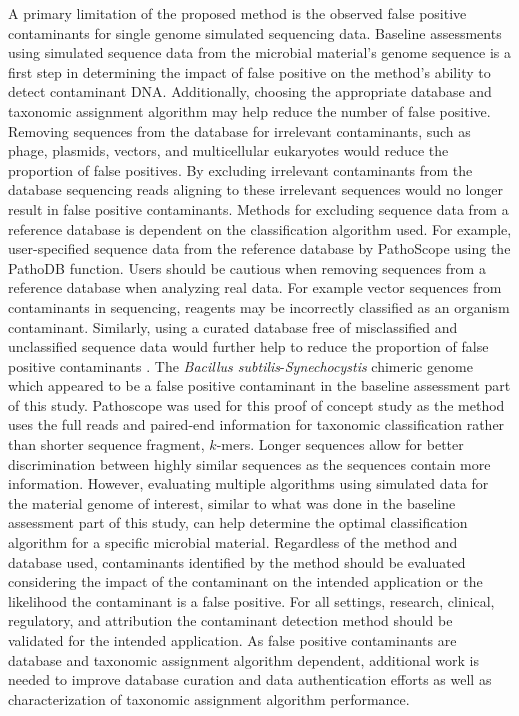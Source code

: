 \documentclass[fleqn,10pt,lineno]{wlpeerj}\usepackage[]{graphicx}\usepackage[]{color}
\begin{document}
A primary limitation of the proposed method is the observed false positive contaminants for single genome simulated sequencing data. 
Baseline assessments using simulated sequence data from the microbial material's genome sequence is a first step in determining the impact of false positive on the method's ability to detect contaminant DNA. 
Additionally, choosing the appropriate database and taxonomic assignment algorithm may help reduce the number of false positive.
Removing sequences from the database for irrelevant contaminants, such as phage, plasmids, vectors, and multicellular eukaryotes would reduce the proportion of false positives. 
By excluding irrelevant contaminants from the database sequencing reads aligning to these irrelevant sequences would no longer result in false positive contaminants. 
Methods for excluding sequence data from a reference database is dependent on the classification algorithm used. 
For example, user-specified sequence data from the reference database by PathoScope using the PathoDB function. 
Users should be cautious when removing sequences from a reference database when analyzing real data. 
For example vector sequences from contaminants in sequencing, reagents may be incorrectly classified as an organism contaminant. 
Similarly, using a curated database free of misclassified and unclassified sequence data would further help to reduce the proportion of false positive contaminants \citep{tennessen2015prodege}. 
The \textit{Bacillus subtilis}-\textit{Synechocystis} chimeric genome which appeared to be a false positive contaminant in the baseline assessment part of this study. 
Pathoscope was used for this proof of concept study as the method uses the full reads and paired-end information for taxonomic classification rather than shorter sequence fragment, $k$-mers. 
Longer sequences allow for better discrimination between highly similar sequences as the sequences contain more information. 
However, evaluating multiple algorithms using simulated data for the material genome of interest, 
similar to what was done in the baseline assessment part of this study, 
can help determine the optimal classification algorithm for a specific microbial material. 
Regardless of the method and database used, contaminants identified by the method should be evaluated considering the impact of the contaminant on the intended application or the likelihood the contaminant is a false positive. 
For all settings, research, clinical, regulatory, and attribution the contaminant detection method should be validated for the intended application. 
As false positive contaminants are database and taxonomic assignment algorithm dependent, additional work is needed to improve database curation and data authentication efforts as well as characterization of taxonomic assignment algorithm performance.  
\end{document}

